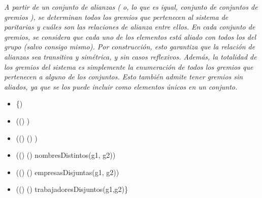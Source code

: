 \emph{
A partir de un conjunto de alianzas ( o, lo que es igual, conjunto de conjuntos de gremios ), se determinan todos los gremios que pertenecen al sistema de paritarias y cu\'ales son las relaciones de alianza entre ellos. En cada conjunto de gremios, se considera que cada uno de los elementos est\'a aliado con todos los del grupo (salvo consigo mismo). Por construcci\'on, esto garantiza que la relaci\'on de alianzas sea transitiva y sim\'etrica, y sin casos reflexivos. Adem\'as, la totalidad de los gremios del sistema es simplemente la enumeraci\'on de todos los gremios que pertenecen a alguno de los conjuntos. Esto tambi\'en admite tener gremios sin aliados, ya que se los puede incluir como elementos \'unicos en un conjunto.
}

\begin{tad}{}





\tadObservadores

\tadGeneradores
	\begin{itemize}
		\item[] \{\mnot {})\mand
		\item[] (() \mnot {})\mand
		\item[] (() () )\mand
		\item[] (() () nombresDistintos(g1, g2))\mand
		\item[] (() () empresasDisjuntas(g1, g2))\mand
		\item[] (() () trabajadoresDisjuntos(g1,g2)\}
	\end{itemize}


\end{tad}
